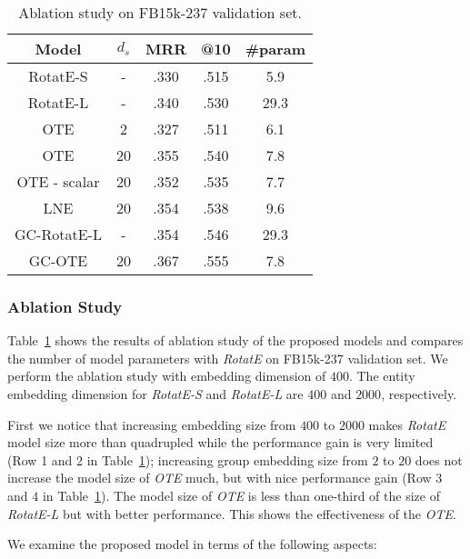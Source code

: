 \documentclass[11pt,a4paper]{article}
\begin{document}
\begin{table}[!h]
    \small
    \centering
    \begin{tabular}{c|c|c|c|c}
        \hline
        Model & $d_s$ & MRR & @10 & \#param\\
         \hline
         RotatE-S & - & .330 & .515 & 5.9 \\
         \hline
         RotatE-L & - & .340 & .530 & 29.3 \\
         \hline
         \hline
         OTE & 2 & .327 & .511 & 6.1 \\
         \hline
         OTE & 20 & .355 & .540 & 7.8 \\
         \hline
         \hline
         OTE - scalar & 20 & .352 & .535 & 7.7 \\
         \hline
         LNE & 20 & .354 & .538 & 9.6 \\
\hline
         \hline
         GC-RotatE-L & - & .354  & .546 & 29.3 \\
         \hline
         GC-OTE & 20 & .367 & .555 & 7.8 \\
         \hline
    \end{tabular}
 \caption{Ablation study on FB15k-237 validation set.} 
    \label{tab:ablation}
\end{table}

\subsubsection{Ablation Study}
Table~\ref{tab:ablation} shows the results of ablation study of the proposed models and compares the number of model parameters with \textit{RotatE} on FB15k-237 validation set. We perform the ablation study with embedding dimension of $400$. The entity embedding dimension for {\it RotatE-S} and {\it RotatE-L} are $400$ and $2000$, respectively.

First we notice that increasing embedding size from $400$ to $2000$ makes {\it RotatE} model size more than quadrupled while the performance gain is very limited (Row 1 and 2 in Table~\ref{tab:ablation}); increasing group embedding size from $2$ to $20$ does not increase the model size of {\it OTE} much, but with nice performance gain (Row $3$ and $4$ in Table~\ref{tab:ablation}). The model size of {\it OTE} is less than one-third of the size of {\it RotatE-L} but with better performance. This shows the effectiveness of the {\it OTE}.

We examine the proposed model in terms of the following aspects:
\end{document}
